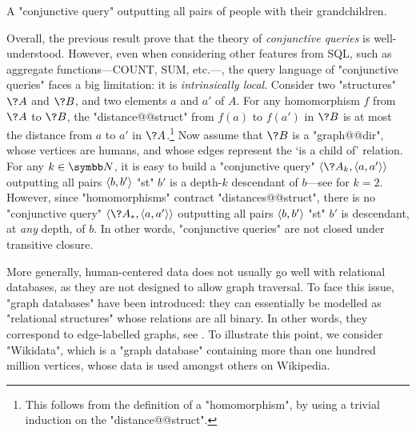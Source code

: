 \begin{marginfigure}
	\centering
	\caption{
		\AP\label{fig:CQ-grandchild}
		A "conjunctive query" outputting all pairs of people with their grandchildren.
	}
\end{marginfigure}
Overall, the previous result prove that the theory of \emph{conjunctive queries} is well-understood.
However, even when considering other features from SQL, such as aggregate functions---\textsf{COUNT}, \textsf{SUM}, etc.---, the query language of "conjunctive queries" faces a big limitation:
it is \emph{intrinsically local}.
Consider two "structures" $\?A$ and $\?B$, and two elements $a$ and $a'$ of $A$.
For any homomorphism $f$ from $\?A$ to $\?B$, the "distance@@struct" from $f(a)$ to $f(a')$
in $\?B$ is at most the distance from $a$ to $a'$ in $\?A$.\footnote{This follows from
the definition of a "homomorphism", by using a trivial induction on the "distance@@struct".}
Now assume that $\?B$ is a "graph@@dir", whose vertices are humans,
and whose edges represent the `is a child of' relation.
For any $k\in\N$, it is easy to build a "conjunctive query" $\tup{\?A_k, \tup{a, a'}}$
outputting all pairs $\langle b,b'\rangle$ "st" $b'$ is a depth-$k$ descendant of $b$---see
 for $k=2$.
However, since "homomorphisms" contract "distances@@struct", there is no
"conjunctive query" $\tup{\?A_*, \tup{a, a'}}$ outputting all pairs $\langle b,b'\rangle$
"st" $b'$ is descendant, at \emph{any} depth, of $b$.
In other words, "conjunctive queries" are not closed under transitive closure.

More generally, human-centered data does not usually go well with
relational databases, as they are not designed to allow graph traversal.
To face this issue, "graph databases" have
been introduced: they can essentially be modelled
as "relational structures" whose relations are all binary. In other
words, they correspond to edge-labelled graphs, see .%
To illustrate this point, we consider
"Wikidata", which is a "graph database" containing more than one hundred million
vertices, whose data is used amongst others on Wikipedia. 

